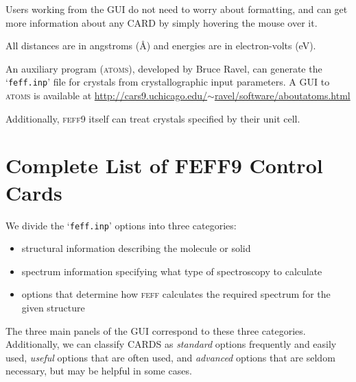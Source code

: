 \documentclass[11pt,oneside]{report} %
\renewcommand{\htmladdnormallink}[2]{\href{#2}{#1}}
\newcommand{\program}[1]{\textsc{#1}}
\newcommand{\feff}{\program{feff}}
\newcommand{\vnum}{9}
\newcommand{\feffcur}{\feff\vnum}
\newcommand{\file}[1]{`\texttt{#1}'}
\newcommand{\atoms}{\program{atoms}}
\begin{document}
Users working from the GUI do not need to worry about formatting, and can get more information about any CARD by simply hovering the mouse over it.

All distances are in angstroms ({\AA}) and energies are in electron-volts (eV). 

An auxiliary program ({\atoms}), developed
by Bruce Ravel, can generate the \file{feff.inp} file for crystals from crystallographic 
input parameters. A GUI to {\atoms} is
available at \htmladdnormallink
{http://cars9.uchicago.edu/$\sim$ravel/software/aboutatoms.html}
{http://cars9.uchicago.edu/~ravel/software/aboutatoms.html}

Additionally, {\feffcur} itself can treat crystals specified by their unit cell.



\section{Complete List of FEFF9 Control Cards}
\label{sec:Complete-list-FEFF9}


We divide the \file{feff.inp} options into three categories: 
\begin{itemize}
\item structural information describing the molecule or solid
\item spectrum information specifying what type of spectroscopy to calculate
\item options that determine how {\feff} calculates the required spectrum for the given structure
\end{itemize}

The three main panels of the GUI correspond to these three categories.  Additionally, we can
classify CARDS as \textsl{standard} options frequently and easily used, \textsl{useful}
options that are often used, and \textsl{advanced} options that are
seldom necessary, but may be helpful in some cases.
\end{document}
